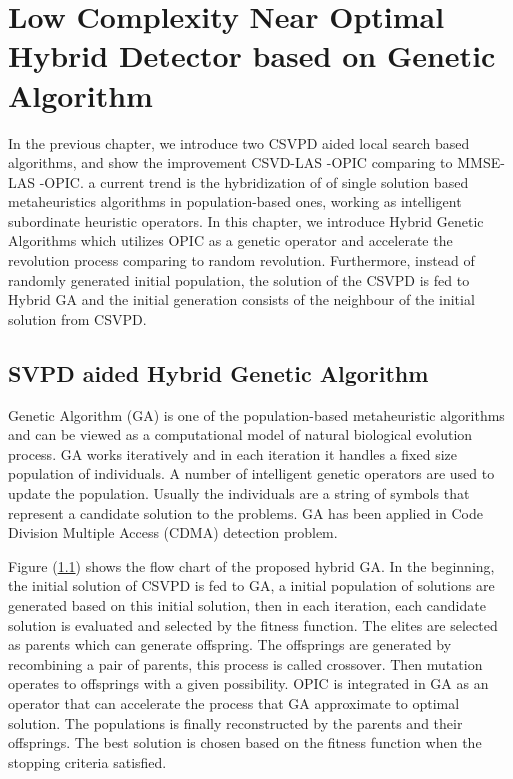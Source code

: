 \resetdatestamp

\chapter{Low Complexity Near Optimal Hybrid Detector based on Genetic Algorithm}\label{Chapter GA}
In the previous chapter, we introduce two CSVPD aided local search based algorithms, and show the improvement CSVD-LAS -OPIC comparing to MMSE-LAS -OPIC.    
a current trend is the hybridization of of single solution based metaheuristics algorithms in population-based ones, working as intelligent subordinate heuristic operators. In this chapter, we introduce Hybrid Genetic Algorithms which utilizes OPIC as a genetic operator and accelerate the revolution process comparing to random revolution. Furthermore, instead of randomly generated initial population, the solution of the CSVPD is fed to Hybrid GA and the initial generation consists of the neighbour of the initial solution from CSVPD.  
\section{SVPD aided Hybrid Genetic Algorithm}
Genetic Algorithm (GA) is one of the population-based metaheuristic algorithms and can be viewed as a computational model of natural biological evolution process. GA works iteratively and in each iteration it handles a fixed size population of individuals. A number of intelligent genetic operators are used to update the population. Usually the individuals are a string of symbols that represent a candidate solution to the problems. GA has been applied in Code Division Multiple Access (CDMA) detection problem\cite{juntti1997genetic}\cite{ergun2000multiuser}.  

Figure (\ref{}) shows the flow chart of the proposed hybrid GA. In the beginning, the initial solution of CSVPD is fed to GA, a initial population of solutions are generated based on this initial solution, then in each iteration, each candidate solution is evaluated and selected by the fitness function. The elites are selected as parents which can generate offspring. The offsprings are generated by recombining a pair of parents, this process is called crossover. Then mutation operates to offsprings with a given possibility. OPIC is integrated in GA as an operator that can accelerate the process that GA approximate to optimal solution. The populations is finally reconstructed by the parents and their offsprings. The best solution is chosen based on the fitness function when the stopping criteria satisfied.
